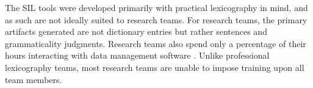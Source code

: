 \documentclass[11pt]{article}
\newcommand{\smalltodo}[2][]
    {\todo[caption={#2}, #1]
    {\tiny#2\normalsize}}
\begin{document}
The SIL tools were developed primarily with practical 
lexicography in mind, and as such are not ideally suited to research teams. For
research teams, the primary artifacts generated are not dictionary entries but
rather sentences and grammaticality judgments.  Research teams also spend only
a percentage of their hours interacting with data management software
\cite{Butler:2007,rogers10,robinson07}. Unlike professional lexicography teams,
most research teams are unable to impose training upon all team members.%

 
\end{document}
